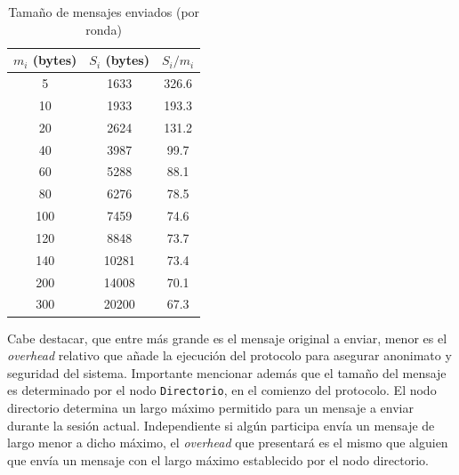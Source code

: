 \begin{table}[h!]
\centering
\begin{tabular}[h!]{|c|c|c|}
\hline
$m_i$ (bytes) & $S_i$ (bytes) & $S_i / m_i$ \\ \hline
5                                   & 1633                               & 326.6       \\ \hline
10                                  & 1933                               & 193.3       \\ \hline
20                                  & 2624                               & 131.2       \\ \hline
40                                  & 3987                               & 99.7        \\ \hline
60                                  & 5288                               & 88.1        \\ \hline
80                                  & 6276                               & 78.5        \\ \hline
100                                 & 7459                               & 74.6        \\ \hline
120                                 & 8848                               & 73.7        \\ \hline
140                                 & 10281                              & 73.4        \\ \hline
200                                 & 14008                              & 70.1        \\ \hline
300                                 & 20200                              & 67.3        \\ \hline
\end{tabular}
\caption{Tamaño de mensajes enviados (por ronda)}
\label{table:message_sizes_table}
\end{table}

Cabe destacar, que entre más grande es el mensaje original a enviar, menor es 
el \emph{overhead} relativo que añade la ejecución del protocolo para asegurar 
anonimato y seguridad del sistema. Importante mencionar además que el tamaño 
del mensaje es determinado por el nodo \texttt{Directorio}, en el comienzo del 
protocolo. El nodo directorio determina un largo máximo permitido para un 
mensaje a enviar durante la sesión actual. Independiente si algún participa 
envía un mensaje de largo menor a dicho máximo, el \emph{overhead} que 
presentará es el mismo que alguien que envía un mensaje con el largo máximo 
establecido por el nodo directorio.


